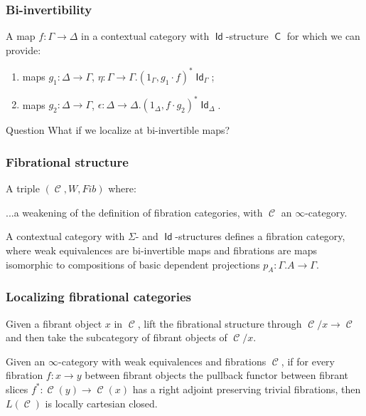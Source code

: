 \documentclass{beamer}
\DeclareMathOperator{\Id}{\mathsf{Id}}
\DeclareMathOperator{\sfC}{\mathsf{C}}
\DeclareMathOperator{\cC}{\mathcal{C}}
\begin{document}
\begin{frame}
  \frametitle{Bi-invertibility}

  \begin{defn}
    A map $f\colon\Gamma\rightarrow\Delta$ in a contextual category with
    $\Id$-structure $\sfC$ for which we can provide:
    \begin{enumerate}
      \item maps $g_1\colon\Delta\rightarrow\Gamma$,
        $\eta\colon\Gamma\rightarrow\Gamma.(1_\Gamma,g_1\cdot f)^*\Id_\Gamma$;
      \item maps $g_2\colon\Delta\rightarrow\Gamma$,
        $\epsilon\colon\Delta\rightarrow\Delta.(1_\Delta,f\cdot g_2)^*\Id_\Delta$.
    \end{enumerate}
  \end{defn}
  \pause

  \begin{block}{Question}
    What if we localize at bi-invertible maps?
  \end{block}
\end{frame}

\begin{frame}
  \frametitle{Fibrational structure}
  
  \begin{defn}
    A triple $(\cC,W,Fib)$ where:

    ...a weakening of the definition of fibration categories, with $\cC$ an
    $\infty$-category.
  \end{defn}
  \pause

  \begin{thm}
    A contextual category with $\Sigma$- and $\Id$-structures defines a
    fibration category, where weak equivalences are bi-invertible maps and
    fibrations are maps isomorphic to  compositions of basic dependent
    projections $p_A\colon\Gamma.A\rightarrow\Gamma$.
  \end{thm}
\end{frame}

\begin{frame}
  \frametitle{Localizing fibrational categories}

  \begin{construction}[fibrant slice $\cC(x)$]
    Given a fibrant object $x$ in $\cC$, lift the fibrational structure through
    $\cC/x\rightarrow\cC$ and then take the subcategory of fibrant objects
    of $\cC/x$.
  \end{construction}
  \pause

  \begin{prop}[Cisinski]
    Given an $\infty$-category with weak equivalences and fibrations $\cC$, if
    for every fibration $f\colon x\rightarrow y$ between fibrant objects the
    pullback functor between fibrant slices $f^*\colon\cC(y)\rightarrow\cC(x)$
    has a right adjoint preserving trivial fibrations, then $L(\cC)$ is locally
    cartesian closed.
  \end{prop}

\end{frame}
\end{document}
